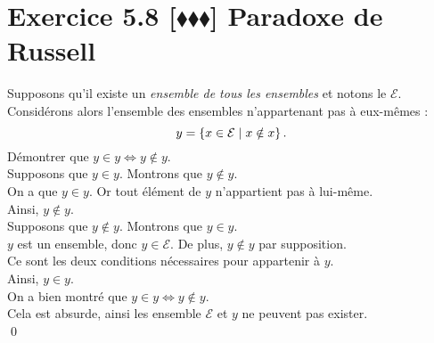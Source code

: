 \documentclass[10pt]{article}
\begin{document}
\section*{Exercice 5.8 [$\blacklozenge\blacklozenge\blacklozenge$] Paradoxe de Russell}
\begin{tcolorbox}[enhanced, width=7in, center, size=fbox, fontupper=\large, drop shadow southwest]
    Supposons qu'il existe un \emph{ensemble de tous les ensembles} et notons le $\mathcal{E}$.\\
    Considérons alors l'ensemble des ensembles n'appartenant pas à eux-mêmes :
    \begin{equation*}
        y=\left\lbrace x \in \mathcal{E} \hspace{0.1cm} | \hspace{0.1cm} x \notin x \right\rbrace.
    \end{equation*}
    Démontrer que $y \in y \iff y \notin y$.\\[0.25cm]
    Supposons que $y \in y$. Montrons que $y \notin y$.\\
    On a que $y \in y$.
    Or tout élément de $y$ n'appartient pas à lui-même.\\
    Ainsi, $y \notin y$.\\[0.25cm]
    Supposons que $y \notin y$. Montrons que $y \in y$.\\
    $y$ est un ensemble, donc $y \in \mathcal{E}$. De plus, $y \notin y$ par supposition.\\
    Ce sont les deux conditions nécessaires pour appartenir à $y$.\\
    Ainsi, $y \in y$.\\[0.25cm]
    On a bien montré que $y \in y \iff y \notin y$.\\
    Cela est absurde, ainsi les ensemble $\mathcal{E}$ et $y$ ne peuvent pas exister.\\
    \qed
\end{tcolorbox}

\end{document}
